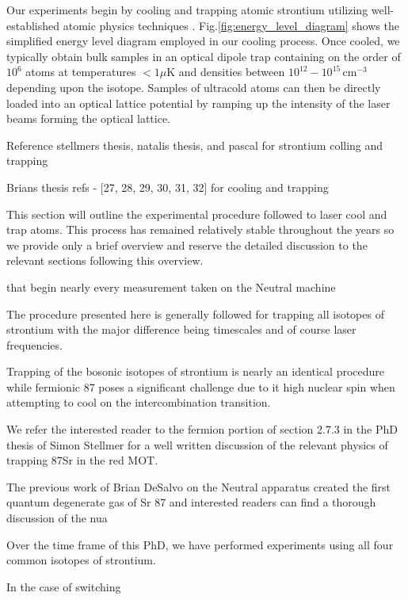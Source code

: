Our experiments begin by cooling and trapping atomic strontium utilizing well-established atomic physics techniques \cite{Metcalf1999,Katori1999,Ido2000,Nagel2003,Mukaiyama2003a,Loftus2004,DeEscobar2009a,Stellmer2009,Stellmer2010,Mickelson2010,DeSalvo2010,Tey2010a}. Fig.\;\ref{fig:energy_level_diagram} shows the simplified energy level diagram employed in our cooling process. Once cooled, we typically obtain bulk samples in an optical dipole trap containing on the order of $10^6$ atoms at temperatures $<1\mu$K and densities between $10^{12} - 10^{15}\,$cm$^{-3}$ depending upon the isotope. Samples of ultracold atoms can then be directly loaded into an optical lattice potential by ramping up the intensity of the laser beams forming the optical lattice.

Reference stellmers thesis, natalis thesis, and pascal for strontium colling and trapping

Brians thesis
refs - [27, 28, 29, 30, 31, 32] for cooling and trapping

This section will outline the experimental procedure followed to laser cool and trap atoms. This process has remained relatively stable throughout the years so we provide only a brief overview and reserve the detailed discussion to the relevant sections following this overview.

that begin nearly every measurement taken on the Neutral machine

 The procedure presented here is generally followed for trapping all isotopes of strontium with the major difference being timescales and of course laser frequencies.

Trapping of the bosonic isotopes of strontium is nearly an identical procedure while fermionic 87 poses a significant challenge due to it high nuclear spin when attempting to cool on the intercombination transition. 

We refer the interested reader to the fermion portion of section 2.7.3 in the PhD thesis of Simon Stellmer for a well written discussion of the relevant physics of trapping 87Sr in the red MOT.

The previous work of Brian DeSalvo on the Neutral apparatus created the first quantum degenerate gas of Sr 87 and interested readers can find a thorough discussion of the nua

Over the time frame of this PhD, we have performed experiments using all four common isotopes of strontium.

In the case of switching 


